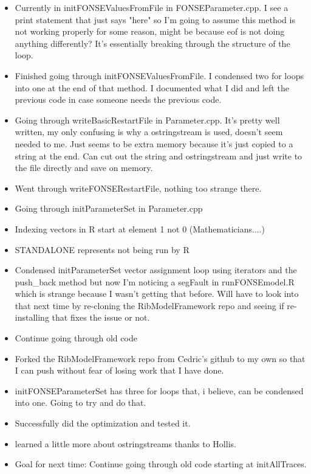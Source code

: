\documentclass[letterpaper,index=totoc,hyperref,openany]{labbook} %
\begin{document}
\begin{itemize}
	\item Currently in initFONSEValuesFromFile in FONSEParameter.cpp. I see a print statement that just says "here" so I'm going to assume this method is not working properly for some reason, might be because eof is not doing anything differently? It's essentially breaking through the structure of the loop.
	\item Finished going through initFONSEValuesFromFile. I condensed two for loops into one at the end of that method. I documented what I did and left the previous code in case someone needs the previous code.
	\item Going through writeBasicRestartFile in Parameter.cpp. It's pretty well written, my only confusing is why a ostringstream is used, doesn't seem needed to me. Just seems to be extra memory because it's just copied to a string at the end. Can cut out the string and ostringstream and just write to the file directly and save on memory.
	\item Went through writeFONSERestartFile, nothing too strange there.
	\item Going through initParameterSet in Parameter.cpp
	\item Indexing vectors in R start at element 1 not 0 (Mathematicians....)
	\item STANDALONE represents not being run by R
	\item Condensed initParameterSet vector assignment loop using iterators and the push\_back method but now I'm noticing a segFault in runFONSEmodel.R which is strange because I wasn't getting that before. Will have to look into that next time by re-cloning the RibModelFramework repo and seeing if re-installing that fixes the issue or not.
\end{itemize}


\begin{itemize}
	\item Continue going through old code
\end{itemize}

\begin{itemize}
	\item Forked the RibModelFramework repo from Cedric's github to my own so that I can push without fear of losing work that I have done.
	\item initFONSEParameterSet has three for loops that, i believe, can be condensed into one. Going to try and do that.
	\item Successfully did the optimization and tested it.
	\item learned a little more about ostringstreams thanks to Hollis. 
	\item Goal for next time: Continue going through old code starting at initAllTraces.
\end{itemize}
\end{document}
